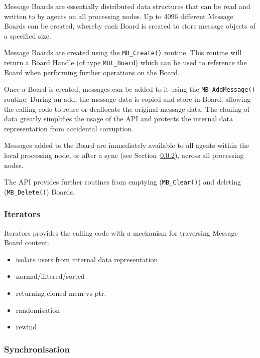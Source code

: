 Message Boards are essentially distributed data structures that can be read and written to by agents on all processing nodes. Up to 4096 different Message Boards can be created, whereby each Board is created to store message objects of a specified size.

Message Boards are created using the \texttt{MB\_Create()} routine. This routine will return a Board Handle (of type \texttt{MBt\_Board}) which can be used to reference the Board when performing further operations on the Board.

Once a Board is created, messages can be added to it using the \texttt{MB\_AddMessage()} routine. During an add, the message data is copied and store in Board, allowing the calling code to reuse or deallocate the original message data. The cloning of data greatly simplifies the usage of the API and protects the internal data representation from accidental corruption. 

Messages added to the Board are immediately available to all agents within the local processing node, or after a sync (see Section~\ref{sec:mb_sync}), across all processing nodes.

The API provides further routines from emptying (\texttt{MB\_Clear()}) and deleting  (\texttt{MB\_Delete()}) Boards.

\subsubsection{Iterators}
\label{sec:mb_interators}

Iterators provides the calling code with a mechanism for traversing Message Board content. 
\begin{itemize}
\item isolate users from internal data representation
\item normal/filtered/sorted
\item returning cloned mem vs ptr.
\item randomisation
\item rewind
\end{itemize} 

\subsubsection{Synchronisation}
\label{sec:mb_sync}

